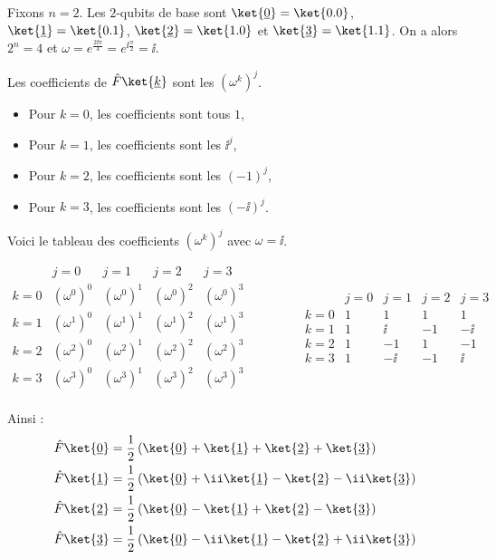 \documentclass[11pt,class=report,crop=false]{standalone}
\begin{document}
\begin{exemple}
Fixons $n=2$. Les $2$-qubits de base sont 
$\ket{\underline 0}=\ket{0.0}$,
$\ket{\underline 1}=\ket{0.1}$, 
$\ket{\underline 2}=\ket{1.0}$ et
$\ket{\underline 3}=\ket{1.1}$.
On a alors $2^n = 4$ et 
$\omega = e^{\frac{2\ii\pi}{4}} = e^{\ii\frac\pi2} = \ii$.


Les coefficients de $\hat F \ket{\underline k}$ sont les $(\omega^k)^j$.
\begin{itemize}
  \item Pour $k=0$, les coefficients sont tous $1$,
  \item Pour $k=1$, les coefficients sont les $\ii^j$,
  \item Pour $k=2$, les coefficients sont les $(-1)^j$,
  \item Pour $k=3$, les coefficients sont les $(-\ii)^j$.
\end{itemize}

Voici le tableau des coefficients $(\omega^k)^j$ avec $\omega=\ii$.
\begin{center}
$$
\begin{array}{c|cccc}
      & j=0 & j=1 & j=2 & j=3 \\ \hline
k = 0 & (\omega^0)^0 & (\omega^0)^1 & (\omega^0)^2 & (\omega^0)^3 \\
k = 1 & (\omega^1)^0 & (\omega^1)^1 & (\omega^1)^2 & (\omega^1)^3 \\
k = 2 & (\omega^2)^0 & (\omega^2)^1 & (\omega^2)^2 & (\omega^2)^3 \\
k = 3 & (\omega^3)^0 & (\omega^3)^1 & (\omega^3)^2 & (\omega^3)^3 \\
\end{array}
\qquad\qquad
\begin{array}{c|cccc}
      & j=0 & j=1 & j=2 & j=3 \\ \hline
k = 0 & 1 & 1 & 1 & 1 \\
k = 1 & 1 & \ii & -1& -\ii \\
k = 2 & 1 & -1 & 1 & -1 \\
k = 3 & 1 & -\ii & -1 & \ii \\
\end{array}
$$
\end{center}


Ainsi :
\begin{align*}
\hat F \ket{\underline0} 
  &= \frac{1}{2} \left(\ket{\underline0} + \ket{\underline1} + \ket{\underline2} + \ket{\underline3}\right) \\
\hat F \ket{\underline1} 
  &= \frac{1}{2} \left(\ket{\underline0} + \ii\ket{\underline1} - \ket{\underline2} -\ii \ket{\underline3}\right) \\
\hat F \ket{\underline2} 
  &= \frac{1}{2} \left(\ket{\underline0} - \ket{\underline1} + \ket{\underline2} - \ket{\underline3}\right) \\
\hat F \ket{\underline3} 
  &= \frac{1}{2} \left(\ket{\underline0} -\ii \ket{\underline1} - \ket{\underline2} +\ii \ket{\underline3}\right) \\
\end{align*}

\end{exemple}
\end{document}
